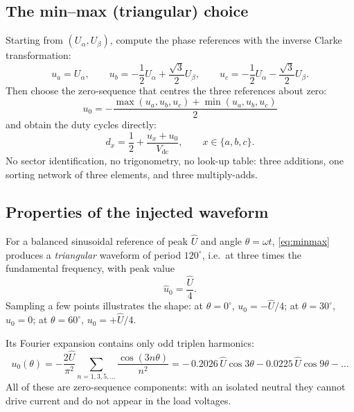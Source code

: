 \documentclass[11pt,a4paper]{article}
\newcommand{\vdc}{V_{\mathrm{dc}}}
\newcommand{\ualpha}{U_{\alpha}}
\newcommand{\ubeta}{U_{\beta}}
\begin{document}
\subsection{The min--max (triangular) choice}

Starting from $(\ualpha, \ubeta)$, compute the phase references with the inverse
Clarke transformation:
\begin{equation}
u_a = \ualpha, \qquad
u_b = -\frac{1}{2}\ualpha + \frac{\sqrt{3}}{2}\ubeta, \qquad
u_c = -\frac{1}{2}\ualpha - \frac{\sqrt{3}}{2}\ubeta .
\end{equation}
Then choose the zero-sequence that centres the three references about zero:
\begin{equation}
\boxed{\;
u_0 = -\frac{\max(u_a,u_b,u_c) + \min(u_a,u_b,u_c)}{2}
\;}
\label{eq:minmax}
\end{equation}
and obtain the duty cycles directly:
\begin{equation}
\boxed{\;
d_x = \frac{1}{2} + \frac{u_x + u_0}{\vdc}, \qquad x \in \{a,b,c\}.
\;}
\label{eq:duty}
\end{equation}
No sector identification, no trigonometry, no look-up table: three additions, one
sorting network of three elements, and three multiply-adds.

\subsection{Properties of the injected waveform}

For a balanced sinusoidal reference of peak $\hat U$ and angle $\theta = \omega t$,
\eqref{eq:minmax} produces a \emph{triangular} waveform of period $120^\circ$, i.e.\
at three times the fundamental frequency, with peak value
\begin{equation}
\hat{u}_0 = \frac{\hat U}{4}.
\end{equation}
Sampling a few points illustrates the shape: at $\theta=0^\circ$,
$u_0 = -\hat U/4$; at $\theta = 30^\circ$, $u_0 = 0$; at $\theta = 60^\circ$,
$u_0 = +\hat U/4$.

Its Fourier expansion contains only odd triplen harmonics:
\begin{equation}
u_0(\theta) = -\frac{2\hat U}{\pi^2}
\sum_{n = 1,3,5,\dots} \frac{\cos(3n\theta)}{n^2}
= -\,0.2026\,\hat U \cos 3\theta - 0.0225\,\hat U \cos 9\theta - \dots
\end{equation}
All of these are zero-sequence components: with an isolated neutral they cannot
drive current and do not appear in the load voltages.
\end{document}
